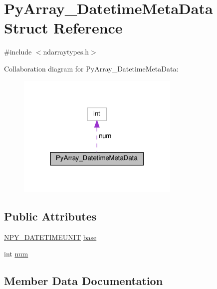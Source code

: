 \hypertarget{structPyArray__DatetimeMetaData}{}\section{Py\+Array\+\_\+\+Datetime\+Meta\+Data Struct Reference}
\label{structPyArray__DatetimeMetaData}


{\ttfamily \#include $<$ndarraytypes.\+h$>$}



Collaboration diagram for Py\+Array\+\_\+\+Datetime\+Meta\+Data\+:
\nopagebreak
\begin{figure}[H]
\begin{center}
\leavevmode
\includegraphics[width=220pt]{structPyArray__DatetimeMetaData__coll__graph}
\end{center}
\end{figure}
\subsection*{Public Attributes}
\begin{DoxyCompactItemize}
\item 
\hyperlink{ndarraytypes_8h_aae07f47944dfcc29fa3dd32ddb5996c3}{N\+P\+Y\+\_\+\+D\+A\+T\+E\+T\+I\+M\+E\+U\+N\+IT} \hyperlink{structPyArray__DatetimeMetaData_aa16c15f1a31ae39fee54d1ded6b70129}{base}
\item 
int \hyperlink{structPyArray__DatetimeMetaData_ab60cb834f25c060d7c98dd26cffc2816}{num}
\end{DoxyCompactItemize}


\subsection{Member Data Documentation}
\mbox{\label{structPyArray__DatetimeMetaData_aa16c15f1a31ae39fee54d1ded6b70129}} 
